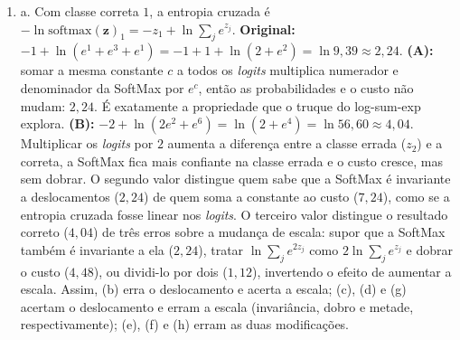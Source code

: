 \documentclass{dlproblemset}
\begin{document}
\begin{enumerate}[1)]
    \item a. Com classe correta $1$, a entropia cruzada é $-\ln \mathrm{softmax}(\mathbf{z})_1 = -z_1 + \ln\sum_j e^{z_j}$. \textbf{Original:} $-1 + \ln(e^1 + e^3 + e^1) = -1 + 1 + \ln(2 + e^{2}) = \ln 9{,}39 \approx 2{,}24$. \textbf{(A):} somar a mesma constante $c$ a todos os \textit{logits} multiplica numerador e denominador da SoftMax por $e^{c}$, então as probabilidades e o custo não mudam: $2{,}24$. É exatamente a propriedade que o truque do log-sum-exp explora. \textbf{(B):} $-2 + \ln(2e^{2} + e^{6}) = \ln(2 + e^{4}) = \ln 56{,}60 \approx 4{,}04$. Multiplicar os \textit{logits} por $2$ aumenta a diferença entre a classe errada ($z_2$) e a correta, a SoftMax fica mais confiante na classe errada e o custo cresce, mas sem dobrar. O segundo valor distingue quem sabe que a SoftMax é invariante a deslocamentos ($2{,}24$) de quem soma a constante ao custo ($7{,}24$), como se a entropia cruzada fosse linear nos \textit{logits}. O terceiro valor distingue o resultado correto ($4{,}04$) de três erros sobre a mudança de escala: supor que a SoftMax também é invariante a ela ($2{,}24$), tratar $\ln\sum_j e^{2z_j}$ como $2\ln\sum_j e^{z_j}$ e dobrar o custo ($4{,}48$), ou dividi-lo por dois ($1{,}12$), invertendo o efeito de aumentar a escala. Assim, (b) erra o deslocamento e acerta a escala; (c), (d) e (g) acertam o deslocamento e erram a escala (invariância, dobro e metade, respectivamente); (e), (f) e (h) erram as duas modificações.
\end{enumerate}
\end{document}

